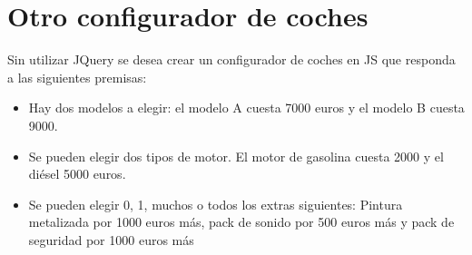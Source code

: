 \documentclass[letterpaper,10pt,spanish]{sphinxmanual}
\begin{document}
\section{Otro configurador de coches}
\label{tema4:otro-configurador-de-coches}
Sin utilizar JQuery se desea crear un configurador de coches en JS que responda a las siguientes premisas:
\begin{itemize}
\item {} 
Hay dos modelos a elegir: el modelo A cuesta 7000 euros y el modelo B cuesta 9000.

\item {} 
Se pueden elegir dos tipos de motor. El motor de gasolina cuesta 2000 y el diésel 5000 euros.

\item {} 
Se pueden elegir 0, 1, muchos o todos los extras siguientes: Pintura metalizada por 1000 euros más, pack de sonido por 500 euros más y pack de seguridad por 1000 euros más

\end{itemize}
\end{document}
